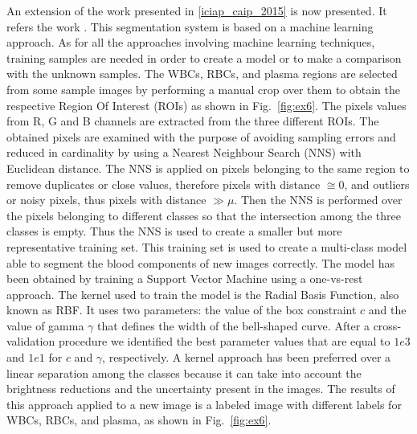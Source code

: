 {	An extension of the work presented in \ref{iciap_caip_2015} is now presented. It refers the work \cite{DiRuberto2016}.
	This segmentation system is based on a machine learning approach. As for all the approaches involving machine learning techniques, training samples are needed in order to create a model or to make a comparison with the unknown samples. The WBCs, RBCs, and plasma regions are selected from some sample images by performing a manual crop over them to obtain the respective Region Of Interest (ROIs) as shown in Fig.~\ref{fig:ex6}. The pixels values from R, G and B channels are extracted from the three different ROIs. The obtained pixels are examined with the purpose of avoiding sampling errors and reduced in cardinality by using a Nearest Neighbour Search (NNS) with Euclidean distance. The NNS is applied on pixels belonging to the same region to remove duplicates or close values, therefore pixels with distance $ \cong 0$, and outliers or noisy pixels, thus pixels with distance $ \gg \mu$. Then the NNS is performed over the pixels belonging to different classes so that the intersection among the three classes is empty. Thus the NNS is used to create a smaller but more representative training set. This training set is used to create a multi-class model able to segment the blood components of new images correctly. The model has been obtained by training a Support Vector Machine using a one-vs-rest approach. The kernel used to train the model is the Radial Basis Function, also known as RBF. It uses two parameters: the value of the box constraint $c$ and the value of gamma $\gamma$ that defines the width of the bell-shaped curve. After a cross-validation procedure we identified the best parameter values that are equal to $1e3$ and $1e1$ for $c$ and $\gamma$, respectively. A kernel approach has been preferred over a linear separation among the classes because it can take into account the brightness reductions and the uncertainty present in the images. The results of this approach applied to a new image is a labeled image with different labels for WBCs, RBCs, and plasma, as shown in Fig.~\ref{fig:ex6}. 
}
